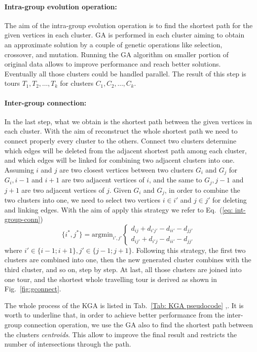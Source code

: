 \documentclass[10pt]{article}
\begin{document}
\paragraph{Intra-group evolution operation:}
The aim of the intra-group evolution operation is to find the shortest path for the given vertices in each cluster.
GA is performed in each cluster aiming to obtain an approximate solution by a couple of genetic operations like selection, crossover, and mutation.
Running the GA algorithm on smaller portion of original data allows to improve performance and reach better solutions.
Eventually all those clusters could be handled parallel.
The result of this step is tours $T_1,T_2,\dots,T_k$ for clusters $C_1,C_2,…,C_k$.
\paragraph{Inter-group connection:}
In the last step, what we obtain is the shortest path between the given vertices in each cluster.
With the aim of reconstruct the whole shortest path we need to connect properly every cluster to the others.
Connect two clusters determine which edges will be deleted from the adjacent shortest path among each cluster, and which edges will be linked for combining two adjacent clusters into one. 
Assuming $i$ and $j$ are two closest vertices between two clusters $G_i$ and $G_j$ for $G_i,i−1$ and $i+1$ are two adjacent vertices of $i$, and the same to $G_j,j−1$ and $j+1$ are two adjacent vertices of $j$. 
Given $G_i$ and $G_j$, in order to combine the two clusters into one, we need to select two vertices $i \in i′$ and $j \in j'$ for deleting and linking edges.
With the aim of apply this strategy we refer to Eq.~(\ref{eq: int-group-conn}) 
\begin{equation}
\{i^*,j^*\} = \mathrm{arg min}_{i',j'} 
\begin{cases}
d_{ij} + d_{i'j'} - d_{ii'} - d_{jj'}\\d_{ij'} + d_{i'j} - d_{ii'} - d_{jj'}
\end{cases}
\label{eq: int-group-conn}
\end{equation}
where $i' \in \{i-1; i+1\}, j' \in \{j-1;j+1\}$.
Following this strategy, the first two clusters are combined into one, then the new generated cluster combines with the third cluster, and so on, step by step. At last, all those clusters are joined into one tour, and the shortest whole travelling tour is derived as shown in Fig.~\ref{fig:gconnect}.

The whole process of the KGA is listed in Tab.~\ref{Tab: KGA pseudocode} \cite{ventitre},\cite{ventiquattro}. It is worth to underline that, in order to achieve better performance from the inter-group connection operation, we use the GA also to find the shortest path between the clusters \textit{centroids}. This allow to improve the final result and restricts the number of intersections through the path.
\end{document}
